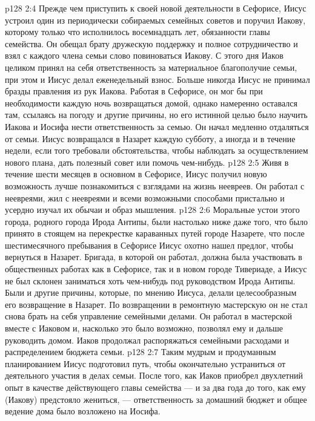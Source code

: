 \vs p128 2:4 \pc Прежде чем приступить к своей новой деятельности в Сефорисе, Иисус устроил один из периодически собираемых семейных советов и поручил Иакову, которому только что исполнилось восемнадцать лет, обязанности главы семейства. Он обещал брату дружескую поддержку и полное сотрудничество и взял с каждого члена семьи слово повиноваться Иакову. С этого дня Иаков целиком принял на себя ответственность за материальное благополучие семьи, при этом и Иисус делал еженедельный взнос. Больше никогда Иисус не принимал бразды правления из рук Иакова. Работая в Сефорисе, он мог бы при необходимости каждую ночь возвращаться домой, однако намеренно оставался там, ссылаясь на погоду и другие причины, но его истинной целью было научить Иакова и Иосифа нести ответственность за семью. Он начал медленно отдаляться от семьи. Иисус возвращался в Назарет каждую субботу, а иногда и в течение недели, если того требовали обстоятельства, чтобы наблюдать за осуществлением нового плана, дать полезный совет или помочь чем\hyp{}нибудь.
\vs p128 2:5 \pc Живя в течение шести месяцев в основном в Сефорисе, Иисус получил новую возможность лучше познакомиться с взглядами на жизнь неевреев. Он работал с неевреями, жил с неевреями и всеми возможными способами пристально и усердно изучал их обычаи и образ мышления.
\vs p128 2:6 Моральные устои этого города, родного города Ирода Антипы, были настолько ниже даже того, что было принято в стоящем на перекрестке караванных путей городе Назарете, что после шестимесячного пребывания в Сефорисе Иисус охотно нашел предлог, чтобы вернуться в Назарет. Бригада, в которой он работал, должна была участвовать в общественных работах как в Сефорисе, так и в новом городе Тивериаде, а Иисус не был склонен заниматься хоть чем\hyp{}нибудь под руководством Ирода Антипы. Были и другие причины, которые, по мнению Иисуса, делали целесообразным его возвращение в Назарет. По возвращении в ремонтную мастерскую он не стал снова брать на себя управление семейными делами. Он работал в мастерской вместе с Иаковом и, насколько это было возможно, позволял ему и дальше руководить домом. Иаков продолжал распоряжаться семейными расходами и распределением бюджета семьи.
\vs p128 2:7 Таким мудрым и продуманным планированием Иисус подготовил путь, чтобы окончательно устраниться от деятельного участия в делах семьи. После того, как Иаков приобрел двухлетний опыт в качестве действующего главы семейства --- и за два года до того, как ему (Иакову) предстояло жениться, --- ответственность за домашний бюджет и общее ведение дома было возложено на Иосифа.
